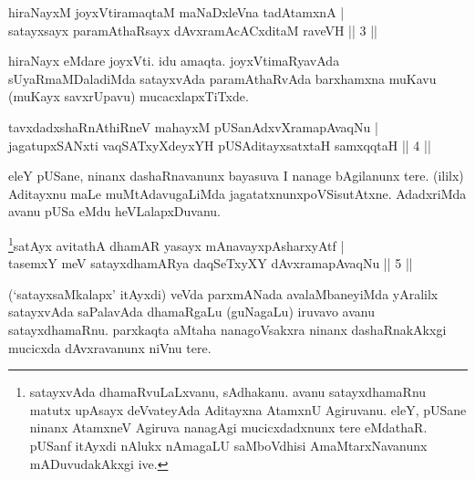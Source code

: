 
\begin{shl}
hiraNayxM joyxVtiramaqtaM maNaDxleVna tadAtamxnA | \\
satayxsayx paramAthaRsayx dAvxramAcACxditaM raveVH \hfill||  3 || 
\end{shl}

\begin{artha} 
hiraNayx eMdare joyxVti. idu amaqta. joyxVtimaRyavAda 
sUyaRmaMDaladiMda satayxvAda paramAthaRvAda barxhamxna muKavu (muKayx 
savxrUpavu) mucacxlapxTiTxde.
\end{artha}


\begin{shl}
tavxdadxshaRnAthiRneV mahayxM pUSanAdxvXramapAvaqNu | \\
jagatupxSANxti vaqSATxyXdeyxYH pUSA\s \s ditayxsatxtaH samxqqtaH \hfill||  4 || 
\end{shl}

\begin{artha} 
eleY pUSane, ninanx dashaRnavanunx bayasuva I nanage bAgilanunx tere. 
(ililx) Aditayxnu maLe muMtAdavugaLiMda jagatatxnunx\break poVSisutAtxne. 
AdadxriMda avanu pUSa eMdu heVLalapxDuvanu.
\end{artha}


\begin{shl}
\footnote{satayxvAda dhamaRvuLaLxvanu, sAdhakanu. avanu satayxdhamaRnu matutx upAsayx deVvateyAda Aditayxna AtamxnU Agiruvanu. eleY, pUSane ninanx AtamxneV Agiruva nanagAgi mucicxdadxnunx tere eMdathaR. pUSanf itAyxdi nAlukx nAmagaLU saMboVdhisi AmaMtarxNavanunx mADuvudakAkxgi ive.}satAyx avitathA dhamAR yasayx mAnavayxpAsharxyAtf | \\
tasemxY meV satayxdhamARya daqSeTxyXY dAvxramapAvaqNu \hfill||  5 || 
\end{shl}

\begin{artha} 
(`satayxsaMkalapx' itAyxdi) veVda parxmANada avalaMbaneyiMda yAralilx 
satayxvAda saPalavAda dhamaRgaLu (guNagaLu) iruvavo avanu 
satayxdhamaRnu. parxkaqta aMtaha nanagoVsakxra ninanx dashaRnakAkxgi 
mucicxda dAvxravanunx niVnu tere.
\end{artha}


